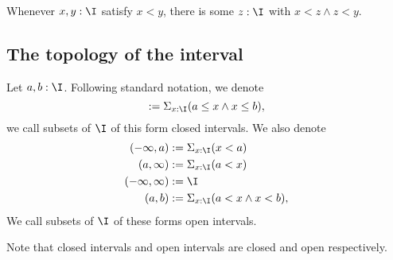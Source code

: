 
\begin{lemma}
  Whenever $x,y:\I$ satisfy $x<y$, there is some $z:\I$ with  $x<z \wedge z< y$. 
\end{lemma} 

%



\subsection{The topology of the interval}


\begin{definition}
  Let $a,b:\I$. 
  Following standard notation, we denote
  \begin{equation}
    [a,b]:= \Sigma_{x:\I} (a\leq x \wedge x \leq b),
  \end{equation}
  we call subsets of $\I$ of this form closed intervals. 
%
  We also denote 
  \begin{align}
    (-\infty,a) &:= \Sigma_{x:\I} (x < a)   \\
    (a,\infty) &:= \Sigma_{x:\I} (a < x)  \\
    (-\infty,\infty) &:= \I  \\
    (a,b) &:= \Sigma_{x:\I} (a < x \wedge x < b),
  \end{align}
  We call subsets of $\I$ of these forms open intervals. 
\end{definition}
\begin{remark}
  Note that closed intervals and open intervals are closed and open respectively. 
\end{remark}


